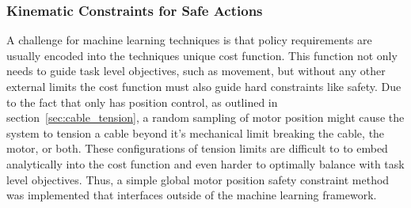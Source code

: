 



\subsubsection{Kinematic Constraints for Safe Actions}

A challenge for machine learning techniques is that policy requirements are usually encoded into the techniques unique cost function.
This function not only needs to guide task level objectives, such as movement, but without any other external limits the cost function must also guide hard constraints like safety.
Due to the fact that \SB{} only has position control, as outlined in section~\ref{sec:cable_tension}, a random sampling of motor position might cause the system to tension a cable beyond it's mechanical limit breaking the cable, the motor, or both.
These configurations of tension limits are difficult to to embed analytically into the cost function and even harder to optimally balance with task level objectives.
Thus, a simple global motor position safety constraint method was implemented that interfaces outside of the machine learning framework.

